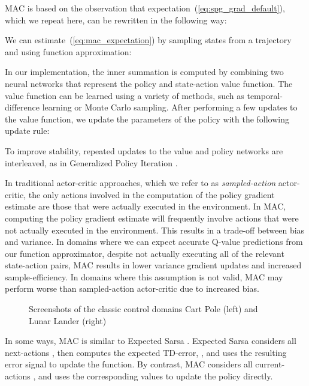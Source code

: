 \documentclass[letterpaper]{article}
\begin{document}
MAC is based on the observation that expectation~(\ref{eq:spg_grad_default}), which we repeat here, can be rewritten in the following way:



We can estimate~(\ref{eq:mac_expectation}) by sampling states from a trajectory and using function approximation:
 

In our implementation, the inner summation is computed by combining two neural networks that represent the policy and state-action value function. The value function can be learned using a variety of methods, such as temporal-difference learning or Monte Carlo sampling. After performing a few updates to the value function, we update the parameters  of the policy with the following update rule:
 

To improve stability, repeated updates to the value and policy networks are interleaved, as in Generalized Policy Iteration \cite{sutton1998reinforcement}.

In traditional actor-critic approaches, which we refer to as \textit{sampled-action} actor-critic, the only actions involved in the computation of the policy gradient estimate are those that were actually executed in the environment. In MAC, computing the policy gradient estimate will frequently involve actions that were not actually executed in the environment. This results in a trade-off between bias and variance. In domains where we can expect accurate Q-value predictions from our function approximator, despite not actually executing all of the relevant state-action pairs, MAC results in lower variance gradient updates and increased sample-efficiency. In domains where this assumption is not valid, MAC may perform worse than sampled-action actor-critic due to increased bias.

\begin{figure}[t]
\centering
\parbox{3.5cm}{
{\setlength{\fboxsep}{0pt}\setlength{\fboxrule}{0.5pt}
}\label{fig:cart_screenshot}}
\qquad
\begin{minipage}{3.5cm}
{\setlength{\fboxsep}{0pt}\setlength{\fboxrule}{0.5pt}
}\label{fig:lunar_screenshot}
\end{minipage}
\caption{Screenshots of the classic control domains Cart Pole (left) and Lunar Lander (right)}
\label{fig:control_screenshots}
\end{figure}

In some ways, MAC is similar to Expected Sarsa \cite{van2009theoretical}. Expected Sarsa considers all next-actions , then computes the expected TD-error, , and uses the resulting error signal to update the  function. By contrast, MAC considers all current-actions , and uses the corresponding  values to update the policy directly.
\end{document}
